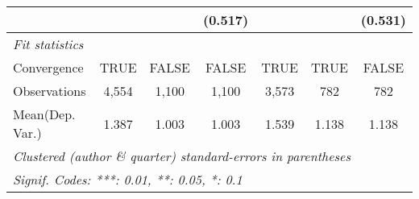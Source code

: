 \begin{tabular}{lcccccc}
                           &             &         & (0.517)      &         &         & (0.531)\\   
   \midrule
   \emph{Fit statistics}\\
   Convergence             &TRUE         & FALSE   & FALSE        & TRUE    & TRUE    & FALSE\\  
   Observations            & 4,554       & 1,100   & 1,100        & 3,573   & 782     & 782\\  
Mean(Dep. Var.) & 1.387 & 1.003 & 1.003 & 1.539 & 1.138 & 1.138 \\
   \midrule \midrule
   \multicolumn{7}{l}{\emph{Clustered (author \& quarter) standard-errors in parentheses}}\\
   \multicolumn{7}{l}{\emph{Signif. Codes: ***: 0.01, **: 0.05, *: 0.1}}\\
\end{tabular}
\par\endgroup

